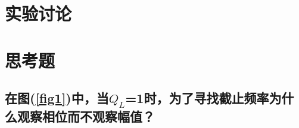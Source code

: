 \documentclass[a4paper]{article}
\begin{document}
\section{实验讨论}

\section{思考题}
\subsection{在图(\ref{fig1})中，当$Q_L$=1时，为了寻找截止频率为什么观察相位而不观察幅值？}

\nocite{jiaocai}

\end{document}
